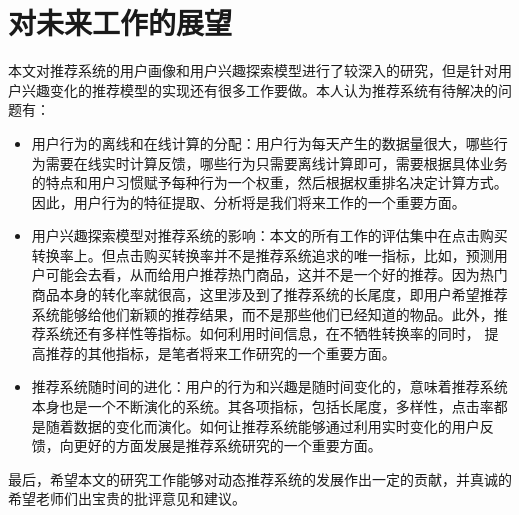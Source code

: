   \section{对未来工作的展望}
  本文对推荐系统的用户画像和用户兴趣探索模型进行了较深入的研究，但是针对用户兴趣变化的推荐模型的实现还有很多工作要做。本人认为推荐系统有待解决的问题有：
    \begin{itemize}
      \item 用户行为的离线和在线计算的分配：用户行为每天产生的数据量很大，哪些行为需要在线实时计算反馈，哪些行为只需要离线计算即可，需要根据具体业务的特点和用户习惯赋予每种行为一个权重，然后根据权重排名决定计算方式。因此，用户行为的特征提取、分析将是我们将来工作的一个重要方面。
      \item 用户兴趣探索模型对推荐系统的影响：本文的所有工作的评估集中在点击购买转换率上。但点击购买转换率并不是推荐系统追求的唯一指标，比如，预测用户可能会去看，从而给用户推荐热门商品，这并不是一个好的推荐。因为热门商品本身的转化率就很高，这里涉及到了推荐系统的长尾度，即用户希望推荐系统能够给他们新颖的推荐结果，而不是那些他们已经知道的物品。此外，推荐系统还有多样性等指标。如何利用时间信息，在不牺牲转换率的同时， 提高推荐的其他指标，是笔者将来工作研究的一个重要方面。
      \item 推荐系统随时间的进化：用户的行为和兴趣是随时间变化的，意味着推荐系统本身也是一个不断演化的系统。其各项指标，包括长尾度，多样性，点击率都是随着数据的变化而演化。如何让推荐系统能够通过利用实时变化的用户反馈，向更好的方面发展是推荐系统研究的一个重要方面。
    \end{itemize}

  最后，希望本文的研究工作能够对动态推荐系统的发展作出一定的贡献，并真诚的希望老师们出宝贵的批评意见和建议。